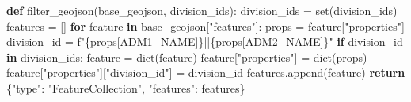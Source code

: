 \documentclass[
  letterpaper,
  DIV=11,
  numbers=noendperiod]{scrartcl}
\newenvironment{Shaded}{\begin{snugshade}}{\end{snugshade}}
\newcommand{\BuiltInTok}[1]{\textcolor[rgb]{0.00,0.23,0.31}{#1}}
\newcommand{\ControlFlowTok}[1]{\textcolor[rgb]{0.00,0.23,0.31}{\textbf{#1}}}
\newcommand{\KeywordTok}[1]{\textcolor[rgb]{0.00,0.23,0.31}{\textbf{#1}}}
\newcommand{\NormalTok}[1]{\textcolor[rgb]{0.00,0.23,0.31}{#1}}
\newcommand{\OperatorTok}[1]{\textcolor[rgb]{0.37,0.37,0.37}{#1}}
\newcommand{\SpecialCharTok}[1]{\textcolor[rgb]{0.37,0.37,0.37}{#1}}
\newcommand{\SpecialStringTok}[1]{\textcolor[rgb]{0.13,0.47,0.30}{#1}}
\newcommand{\StringTok}[1]{\textcolor[rgb]{0.13,0.47,0.30}{#1}}
\begin{document}
\begin{Shaded}
\begin{Highlighting}[]
\KeywordTok{def}\NormalTok{ filter\_geojson(base\_geojson, division\_ids):}
\NormalTok{    division\_ids }\OperatorTok{=} \BuiltInTok{set}\NormalTok{(division\_ids)}
\NormalTok{    features }\OperatorTok{=}\NormalTok{ []}
    \ControlFlowTok{for}\NormalTok{ feature }\KeywordTok{in}\NormalTok{ base\_geojson[}\StringTok{"features"}\NormalTok{]:}
\NormalTok{        props }\OperatorTok{=}\NormalTok{ feature[}\StringTok{"properties"}\NormalTok{]}
\NormalTok{        division\_id }\OperatorTok{=} \SpecialStringTok{f"}\SpecialCharTok{\{}\NormalTok{props[}\StringTok{\textquotesingle{}ADM1\_NAME\textquotesingle{}}\NormalTok{]}\SpecialCharTok{\}}\SpecialStringTok{||}\SpecialCharTok{\{}\NormalTok{props[}\StringTok{\textquotesingle{}ADM2\_NAME\textquotesingle{}}\NormalTok{]}\SpecialCharTok{\}}\SpecialStringTok{"}
        \ControlFlowTok{if}\NormalTok{ division\_id }\KeywordTok{in}\NormalTok{ division\_ids:}
\NormalTok{            feature }\OperatorTok{=} \BuiltInTok{dict}\NormalTok{(feature)}
\NormalTok{            feature[}\StringTok{"properties"}\NormalTok{] }\OperatorTok{=} \BuiltInTok{dict}\NormalTok{(props)}
\NormalTok{            feature[}\StringTok{"properties"}\NormalTok{][}\StringTok{"division\_id"}\NormalTok{] }\OperatorTok{=}\NormalTok{ division\_id}
\NormalTok{            features.append(feature)}
    \ControlFlowTok{return}\NormalTok{ \{}\StringTok{"type"}\NormalTok{: }\StringTok{"FeatureCollection"}\NormalTok{, }\StringTok{"features"}\NormalTok{: features\}}


\end{Highlighting}
\end{Shaded}
\end{document}
